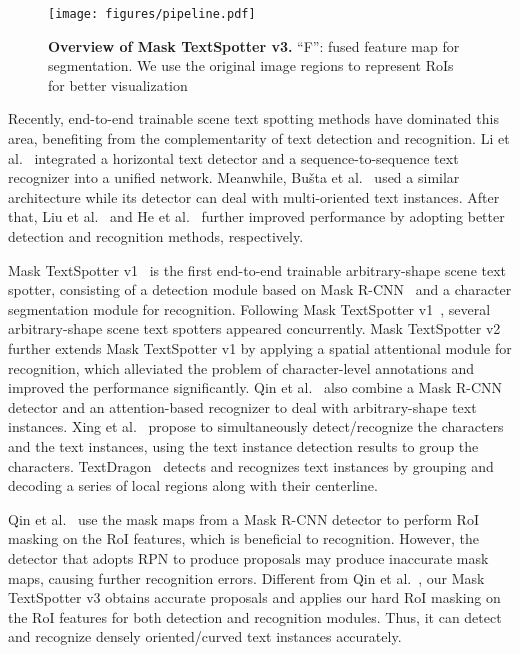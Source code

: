 \documentclass[runningheads]{llncs}
\newcommand{\minisection}[1]{\noindent{\textbf{#1}}}
\begin{document}
\begin{figure*}[ht]
    \centering
    \texttt{[image: figures/pipeline.pdf]}
    \caption{\textbf{Overview of Mask TextSpotter v3.} ``F'': fused feature map for segmentation. We use the original image regions to represent RoIs for better visualization}
    \label{fig:pipeline}
\end{figure*}

\minisection{End-to-end trainable scene text spotting}
Recently, end-to-end trainable scene text spotting methods have dominated this area, benefiting from the complementarity of text detection and recognition. Li et al.~\cite{Li_2017_ICCV} integrated a horizontal text detector and a sequence-to-sequence text recognizer into a unified network. Meanwhile, Bu{\v{s}}ta et al.~\cite{Busta_2017_ICCV} used a similar architecture while its detector can deal with multi-oriented text instances. After that, Liu et al.~\cite{liu2018fots} and He et al.~\cite{he2018end} further improved performance by adopting better detection and recognition methods, respectively. 

Mask TextSpotter v1~\cite{LyuLYWB18} is the first end-to-end trainable arbitrary-shape scene text spotter, consisting of a detection module based on Mask R-CNN~\cite{he2017mask} and a character segmentation module for recognition. 
Following Mask TextSpotter v1~\cite{LyuLYWB18}, several arbitrary-shape scene text spotters appeared concurrently.
Mask TextSpotter v2~\cite{liao2019mask} further extends Mask TextSpotter v1 by applying a spatial attentional module for recognition, which alleviated the problem of character-level annotations and improved the performance significantly. Qin et al.~\cite{qin2019towards} also combine a Mask R-CNN detector and an attention-based recognizer to deal with arbitrary-shape text instances. Xing et al.~\cite{xing2019charnet} propose to simultaneously detect/recognize the characters and the text instances, using the text instance detection results to group the characters. TextDragon~\cite{TextDragon} detects and recognizes text instances by grouping and decoding a series of local regions along with their centerline.

Qin et al.~\cite{qin2019towards} use the mask maps from a Mask R-CNN detector to perform RoI masking on the RoI features, which is beneficial to recognition. However, the detector that adopts RPN to produce proposals may produce inaccurate mask maps, causing further recognition errors. Different from Qin et al.~\cite{qin2019towards}, our Mask TextSpotter v3 obtains accurate proposals and applies our hard RoI masking on the RoI features for both detection and recognition modules. Thus, it can detect and recognize densely oriented/curved text instances accurately.
\end{document}

